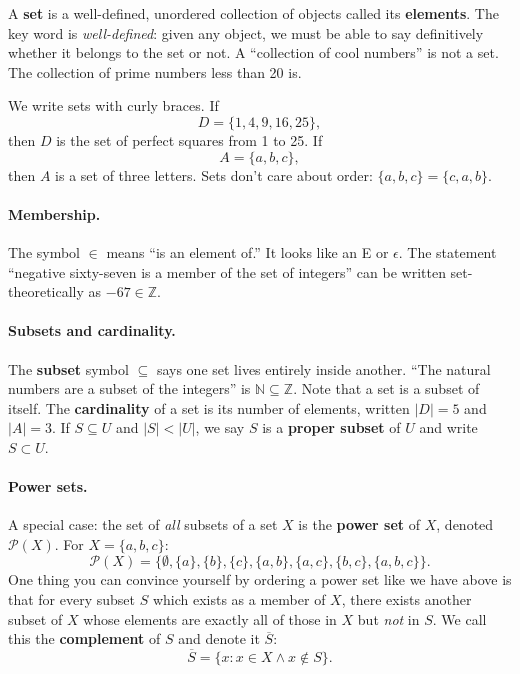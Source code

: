 A \textbf{set} is a well-defined, unordered collection of objects called its
\textbf{elements}. The key word is \emph{well-defined}: given any object, we
must be able to say definitively whether it belongs to the set or not. A
``collection of cool numbers'' is not a set. The collection of prime numbers
less than 20 is.

We write sets with curly braces. If
\[
    D = \{1, 4, 9, 16, 25\},
\]
then $D$ is the set of perfect squares from 1 to 25. If
\[
    A = \{a, b, c\},
\]
then $A$ is a set of three letters. Sets don't care about order: $\{a, b, c\}
= \{c, a, b\}$.

\paragraph{Membership.}
The symbol $\in$ means ``is an element of.'' It looks like an E or
$\epsilon$. The statement ``negative sixty-seven is a member of the set of
integers'' can be written set-theoretically as $-67 \in \mathbb{Z}$.

\paragraph{Subsets and cardinality.}
The \textbf{subset} symbol $\subseteq$ says one set lives entirely inside
another. ``The natural numbers are a subset of the integers'' is
$\mathbb{N} \subseteq \mathbb{Z}$. Note that a set is a subset of itself.
The \textbf{cardinality} of a set is its number of elements, written $|D| =
5$ and $|A| = 3$. If $S \subseteq U$ and $|S| < |U|$, we say $S$ is a
\textbf{proper subset} of $U$ and write $S \subset U$.

\paragraph{Power sets.}
A special case: the set of \emph{all} subsets of a set $X$ is the
\textbf{power set} of $X$, denoted $\mathcal{P}(X)$. For $X = \{a, b, c\}$:
\[
    \mathcal{P}(X) = \bigl\{
        \emptyset, \{a\}, \{b\}, \{c\},
        \{a,b\}, \{a,c\}, \{b,c\},
        \{a,b,c\}
    \bigr\}.
\]
One thing you can convince yourself by ordering a power set like we have above
is that for every subset $S$ which exists as a member of $X$, there exists
another subset of $X$ whose elements are exactly all of those in $X$ but
\emph{not} in $S$. We call this the \textbf{complement} of $S$ and denote it
$\overline{S}$:
\[
    \overline{S} = \{x : x \in X \wedge x \notin S\}.
\]

